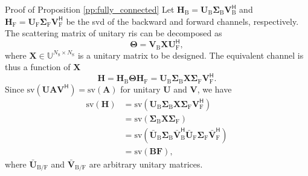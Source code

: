 \documentclass[journal]{IEEEtran}
\begin{document}
\begin{appendix}
	\begin{subsection}{Proof of Proposition \ref{pp:fully_connected}}\label{ap:fully_connected}
		Let $\mathbf{H}_\mathrm{B} = \mathbf{U}_\mathrm{B} \mathbf{\Sigma}_\mathrm{B} \mathbf{V}_\mathrm{B}^\mathsf{H}$ and $\mathbf{H}_\mathrm{F} = \mathbf{U}_\mathrm{F} \mathbf{\Sigma}_\mathrm{F} \mathbf{V}_\mathrm{F}^\mathsf{H}$ be the \gls{svd} of the backward and forward channels, respectively.
		The scattering matrix of unitary \gls{ris} can be decomposed as
		\begin{equation}
			\mathbf{\Theta} = \mathbf{V}_\mathrm{B} \mathbf{X} \mathbf{U}_\mathrm{F}^\mathsf{H},
			\label{eq:scattering_fc}
		\end{equation}
		where $\mathbf{X} \in \mathbb{U}^{N_\mathrm{S} \times N_\mathrm{S}}$ is a unitary matrix to be designed.
		The equivalent channel is thus a function of $\mathbf{X}$
		\begin{equation}
			\mathbf{H} = \mathbf{H}_\mathrm{B} \mathbf{\Theta} \mathbf{H}_\mathrm{F} = \mathbf{U}_\mathrm{B} \mathbf{\Sigma}_\mathrm{B} \mathbf{X} \mathbf{\Sigma}_\mathrm{F} \mathbf{V}_\mathrm{F}^\mathsf{H}.
			\label{eq:channel_equivalent_fc}
		\end{equation}
		Since $\mathrm{sv}(\mathbf{U} \mathbf{A} \mathbf{V}^\mathsf{H}) = \mathrm{sv}(\mathbf{A})$ for unitary $\mathbf{U}$ and $\mathbf{V}$, we have
		\begin{align*}
			\mathrm{sv}(\mathbf{H}) & = \mathrm{sv}(\mathbf{U}_\mathrm{B} \mathbf{\Sigma}_\mathrm{B} \mathbf{X} \mathbf{\Sigma}_\mathrm{F} \mathbf{V}_\mathrm{F}^\mathsf{H})                                                                     \\
			                        & = \mathrm{sv}(\mathbf{\Sigma}_\mathrm{B} \mathbf{X} \mathbf{\Sigma}_\mathrm{F})                                                                                                                            \\
			                        & = \mathrm{sv}(\bar{\mathbf{U}}_\mathrm{B} \mathbf{\Sigma}_\mathrm{B} \mathbf{\bar{V}}_\mathrm{B}^\mathsf{H} \bar{\mathbf{U}}_\mathrm{F} \mathbf{\Sigma}_\mathrm{F} \mathbf{\bar{V}}_\mathrm{F}^\mathsf{H}) \\
			                        & = \mathrm{sv}(\mathbf{BF}),
		\end{align*}
		where $\bar{\mathbf{U}}_{\mathrm{B}/\mathrm{F}}$ and $\bar{\mathbf{V}}_{\mathrm{B}/\mathrm{F}}$ are arbitrary unitary matrices.
	\end{subsection}


\end{appendix}
\end{document}
